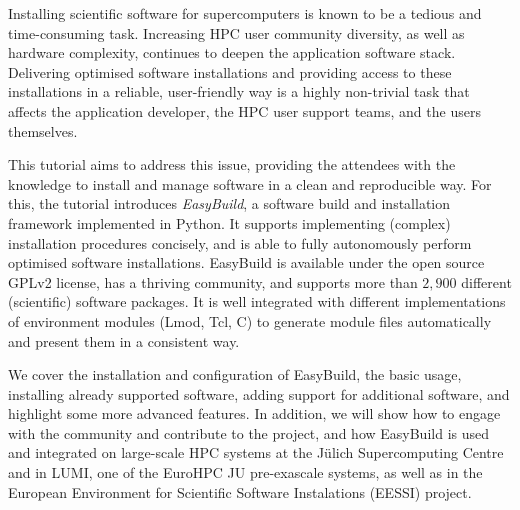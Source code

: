 Installing scientific software for supercomputers is known to be a tedious and time-consuming task. Increasing HPC user
community diversity, as well as hardware complexity, continues to deepen the application software stack. Delivering
optimised software installations and providing access to these installations in a reliable, user-friendly way is a
highly non-trivial task that affects the application developer, the HPC user support teams, and the users themselves.

This tutorial aims to address this issue, providing the attendees with the knowledge to install and manage software in a clean
and reproducible way. For this, the tutorial introduces \emph{EasyBuild}, a software build and installation framework
implemented in Python. It supports implementing (complex) installation procedures concisely, and is able to fully
autonomously perform optimised software installations.
EasyBuild is available under the open source GPLv2 license,
has a thriving community, and supports more than $2,900$ different (scientific) software packages. It is well integrated with different implementations of environment modules (Lmod, Tcl, C) to generate module files automatically and present them in a consistent way.

We cover the installation and configuration of EasyBuild, the basic usage, installing already supported software, adding support for additional software, and highlight some more advanced features.
In addition, we will show how to engage with the community and contribute to the project,
and how EasyBuild is used and integrated on large-scale HPC systems at the J\"ulich Supercomputing Centre
and in LUMI, one of the EuroHPC JU pre-exascale systems, as well as in the European Environment
for Scientific Software Instalations (EESSI) project.
